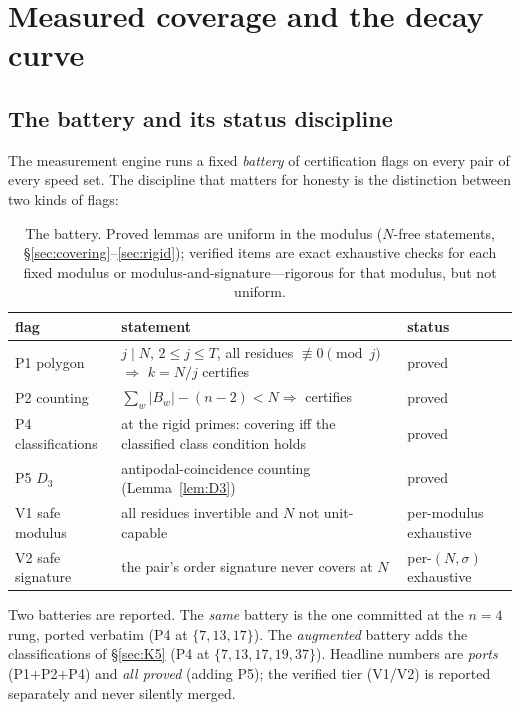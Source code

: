 
\section{Measured coverage and the decay curve}\label{sec:measure}

\subsection{The battery and its status discipline}

The measurement engine runs a fixed \emph{battery} of certification
flags on every pair of every speed set. The discipline that matters for
honesty is the distinction between two kinds of flags:

\begin{table}[htbp]
\centering
\small
\caption{The battery. Proved lemmas are uniform in the modulus
($N$-free statements, \S\ref{sec:covering}--\ref{sec:rigid}); verified
items are exact exhaustive checks for each fixed modulus or
modulus-and-signature---rigorous for that modulus, but not uniform.}
\label{tab:battery}
\begin{tabularx}{\textwidth}{l X l}
\toprule
flag & statement & status \\
\midrule
P1 polygon & $j\mid N$, $2\le j\le T$, all residues $\not\equiv0 \pmod j$
  $\Rightarrow$ $k=N/j$ certifies & proved \\
P2 counting & $\sum_w|B_w|-(n-2)<N\Rightarrow$ certifies & proved \\
P4 classifications & at the rigid primes: covering iff the classified
  class condition holds & proved \\
P5 $D_3$ & antipodal-coincidence counting
  (Lemma~\ref{lem:D3}) & proved \\
V1 safe modulus & all residues invertible and $N$ not unit-capable &
  per-modulus exhaustive \\
V2 safe signature & the pair's order signature never covers at $N$ &
  per-$(N,\sigma)$ exhaustive \\
\bottomrule
\end{tabularx}
\end{table}

Two batteries are reported. The \emph{same} battery is the one committed
at the $n=4$ rung, ported verbatim (P4 at $\{7,13,17\}$). The
\emph{augmented} battery adds the classifications of
\S\ref{sec:K5} (P4 at $\{7,13,17,19,37\}$). Headline numbers are
\emph{ports} (P1$+$P2$+$P4) and \emph{all proved} (adding P5); the
verified tier (V1/V2) is reported separately and never silently merged.

